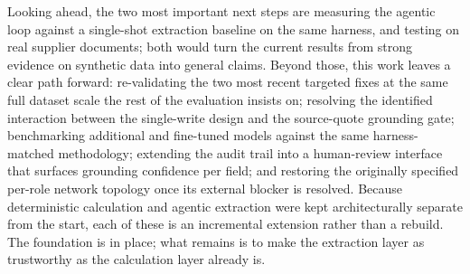 Looking ahead, the two most important next steps are measuring the agentic
loop against a single-shot extraction baseline on the same harness, and
testing on real supplier documents; both would turn the current results
from strong evidence on synthetic data into general claims. Beyond those,
this work leaves a clear path forward: re-validating the
two most recent targeted fixes at the same full dataset scale the rest of
the evaluation insists on; resolving the identified interaction between
the single-write design and the source-quote grounding gate;
benchmarking additional and fine-tuned models against the same
harness-matched methodology; extending the audit trail into a
human-review interface that surfaces grounding confidence per field; and
restoring the originally specified per-role network topology once its
external blocker is resolved. Because deterministic calculation and
agentic extraction were kept architecturally separate from the start,
each of these is an incremental extension rather than a rebuild. The
foundation is in place; what remains is to make the extraction layer as
trustworthy as the calculation layer already is.
